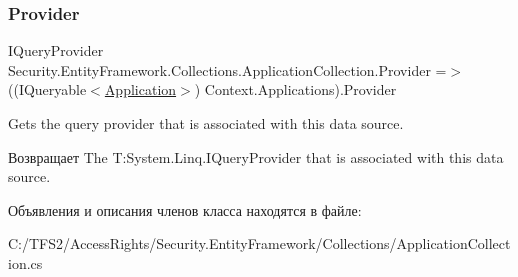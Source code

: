 \subsubsection{\texorpdfstring{Provider}{Provider}}
{\footnotesize\ttfamily I\+Query\+Provider Security.\+Entity\+Framework.\+Collections.\+Application\+Collection.\+Provider =$>$ ((I\+Queryable$<$\hyperlink{class_security_1_1_model_1_1_application}{Application}$>$) Context.\+Applications).Provider}



Gets the query provider that is associated with this data source. 

\begin{DoxyReturn}{Возвращает}
The T\+:\+System.\+Linq.\+I\+Query\+Provider that is associated with this data source. 
\end{DoxyReturn}


Объявления и описания членов класса находятся в файле\+:\begin{DoxyCompactItemize}
\item 
C\+:/\+T\+F\+S2/\+Access\+Rights/\+Security.\+Entity\+Framework/\+Collections/Application\+Collection.\+cs\end{DoxyCompactItemize}
